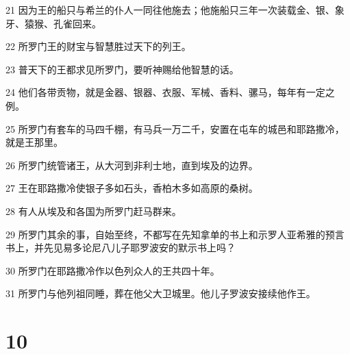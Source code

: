 \par 21 因为王的船只与希兰的仆人一同往他施去；他施船只三年一次装载金、银、象牙、猿猴、孔雀回来。
\par 22 所罗门王的财宝与智慧胜过天下的列王。
\par 23 普天下的王都求见所罗门，要听神赐给他智慧的话。
\par 24 他们各带贡物，就是金器、银器、衣服、军械、香料、骡马，每年有一定之例。
\par 25 所罗门有套车的马四千棚，有马兵一万二千，安置在屯车的城邑和耶路撒冷，就是王那里。
\par 26 所罗门统管诸王，从大河到非利士地，直到埃及的边界。
\par 27 王在耶路撒冷使银子多如石头，香柏木多如高原的桑树。
\par 28 有人从埃及和各国为所罗门赶马群来。
\par 29 所罗门其余的事，自始至终，不都写在先知拿单的书上和示罗人亚希雅的预言书上，并先见易多论尼八儿子耶罗波安的默示书上吗？
\par 30 所罗门在耶路撒冷作以色列众人的王共四十年。
\par 31 所罗门与他列祖同睡，葬在他父大卫城里。他儿子罗波安接续他作王。

\chapter{10}

